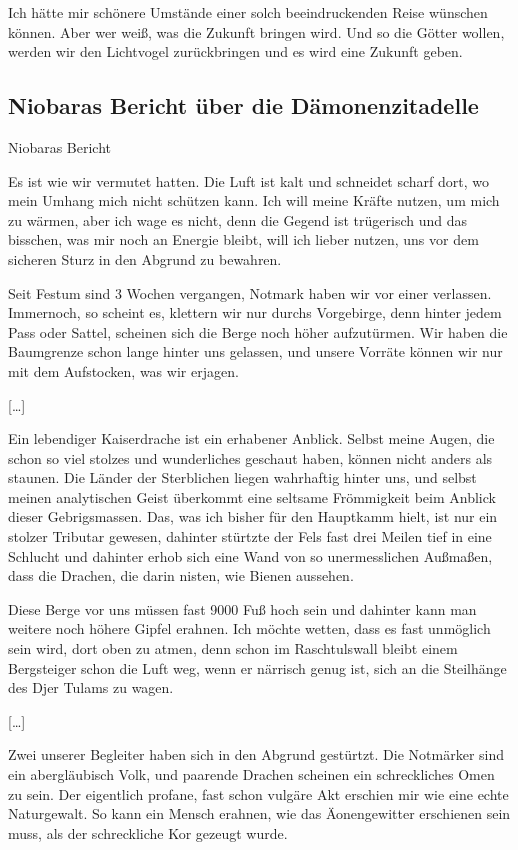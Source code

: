 Ich hätte mir schönere Umstände einer solch beeindruckenden Reise wünschen können. Aber wer weiß, was die Zukunft bringen wird. Und so die Götter wollen, werden wir den Lichtvogel zurückbringen und es wird eine Zukunft geben.

\subsection{Niobaras Bericht über die Dämonenzitadelle}

Niobaras Bericht

Es ist wie wir vermutet hatten. Die Luft ist kalt und schneidet scharf dort, wo mein Umhang mich nicht schützen kann. Ich will meine Kräfte nutzen, um mich zu wärmen, aber ich wage es nicht, denn die Gegend ist trügerisch und das bisschen, was mir noch an Energie bleibt, will ich lieber nutzen, uns vor dem sicheren Sturz in den Abgrund zu bewahren.

Seit Festum sind 3 Wochen vergangen, Notmark haben wir vor einer verlassen. Immernoch, so scheint es, klettern wir nur durchs Vorgebirge, denn hinter jedem Pass oder Sattel, scheinen sich die Berge noch höher aufzutürmen. Wir haben die Baumgrenze schon lange hinter uns gelassen, und unsere Vorräte können wir nur mit dem Aufstocken, was wir erjagen.

[\dots]

Ein lebendiger Kaiserdrache ist ein erhabener Anblick. Selbst meine Augen, die schon so viel stolzes und wunderliches geschaut haben, können nicht anders als staunen. Die Länder der Sterblichen liegen wahrhaftig hinter uns, und selbst meinen analytischen Geist überkommt eine seltsame Frömmigkeit beim Anblick dieser Gebrigsmassen. Das, was ich bisher für den Hauptkamm hielt, ist nur ein stolzer Tributar gewesen, dahinter stürtzte der Fels fast drei Meilen tief in eine Schlucht und dahinter erhob sich eine Wand von so unermesslichen Außmaßen, dass die Drachen, die darin nisten, wie Bienen aussehen.

Diese Berge vor uns müssen fast 9000 Fuß hoch sein und dahinter kann man weitere noch höhere Gipfel erahnen. Ich möchte wetten, dass es fast unmöglich sein wird, dort oben zu atmen, denn schon im Raschtulswall bleibt einem Bergsteiger schon die Luft weg, wenn er närrisch genug ist, sich an die Steilhänge des Djer Tulams zu wagen.

[\dots] 

Zwei unserer Begleiter haben sich in den Abgrund gestürtzt. Die Notmärker sind ein abergläubisch Volk, und paarende Drachen scheinen ein schreckliches Omen zu sein. Der eigentlich profane, fast schon vulgäre Akt erschien mir wie eine echte Naturgewalt. So kann ein Mensch erahnen, wie das Äonengewitter erschienen sein muss, als der schreckliche Kor gezeugt wurde.

